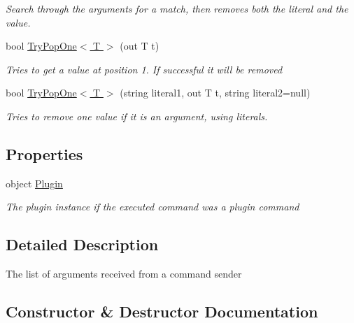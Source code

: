 \begin{DoxyCompactItemize}
\begin{DoxyCompactList}\small\item\em Search through the arguments for a match, then removes both the literal and the value. \end{DoxyCompactList}\item 
bool \hyperlink{classOTA_1_1Command_1_1ArgumentList_ad2910029c92315f97be87569fe7bdec1}{Try\+Pop\+One$<$ T $>$} (out T t)
\begin{DoxyCompactList}\small\item\em Tries to get a value at position 1. If successful it will be removed \end{DoxyCompactList}\item 
bool \hyperlink{classOTA_1_1Command_1_1ArgumentList_a9e956f684c001bb5e73d1027db7f8624}{Try\+Pop\+One$<$ T $>$} (string literal1, out T t, string literal2=null)
\begin{DoxyCompactList}\small\item\em Tries to remove one value if it is an argument, using literals. \end{DoxyCompactList}\end{DoxyCompactItemize}
\subsection*{Properties}
\begin{DoxyCompactItemize}
\item 
object \hyperlink{classOTA_1_1Command_1_1ArgumentList_a2495ccac3aab294aa5f42ee0e268f811}{Plugin}
\begin{DoxyCompactList}\small\item\em The plugin instance if the executed command was a plugin command \end{DoxyCompactList}\end{DoxyCompactItemize}


\subsection{Detailed Description}
The list of arguments received from a command sender 



\subsection{Constructor \& Destructor Documentation}
\hypertarget{classOTA_1_1Command_1_1ArgumentList_ab6e8f177f57931b8a4dc90e1bbf9bcf9}{}
